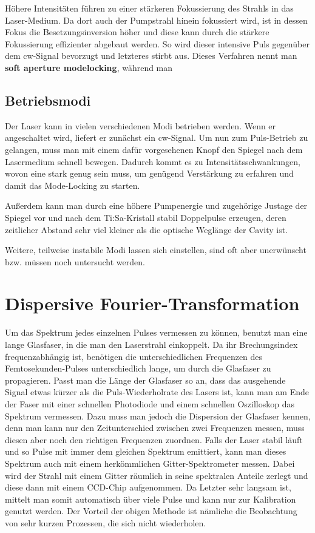 \documentclass[bachelor,       %
               twoside,        %
               BCOR10mm,       %
               english,ngerman, %
               ]{GAUBM}
\begin{document}
Höhere Intensitäten führen zu einer stärkeren Fokussierung des Strahls in das Laser-Medium.
Da dort auch der Pumpstrahl hinein fokussiert wird, ist in dessen Fokus die Besetzungsinversion höher und diese kann durch die stärkere Fokussierung effizienter abgebaut werden.
So wird dieser intensive Puls gegenüber dem cw-Signal bevorzugt und letzteres stirbt aus.
Dieses Verfahren nennt man \textbf{soft aperture modelocking}, während man 
\subsection{Betriebsmodi}
Der Laser kann in vielen verschiedenen Modi betrieben werden.
Wenn er angeschaltet wird, liefert er zunächst ein cw-Signal.
Um nun zum Puls-Betrieb zu gelangen, muss man mit einem dafür vorgesehenen Knopf den Spiegel nach dem Lasermedium schnell bewegen.
Dadurch kommt es zu Intensitätsschwankungen, wovon eine stark genug sein muss, um genügend Verstärkung zu erfahren und damit das Mode-Locking zu starten.

Außerdem kann man durch eine höhere Pumpenergie und zugehörige Justage der Spiegel vor und nach dem Ti:Sa-Kristall stabil Doppelpulse erzeugen, deren zeitlicher Abstand sehr viel kleiner als die optische Weglänge der Cavity ist.

Weitere, teilweise instabile Modi lassen sich einstellen, sind oft aber unerwünscht bzw. müssen noch untersucht werden.


\section{Dispersive Fourier-Transformation}
Um das Spektrum jedes einzelnen Pulses vermessen zu können, benutzt man eine lange Glasfaser, in die man den Laserstrahl einkoppelt.
Da ihr Brechungsindex frequenzabhängig ist, benötigen die unterschiedlichen Frequenzen des Femtosekunden-Pulses unterschiedlich lange, um durch die Glasfaser zu propagieren.
Passt man die Länge der Glasfaser so an, dass das ausgehende Signal etwas kürzer als die Puls-Wiederholrate des Lasers ist, kann man am Ende der Faser mit einer schnellen Photodiode und einem schnellen Oszilloskop das Spektrum vermessen.
Dazu muss man jedoch die Dispersion der Glasfaser kennen, denn man kann nur den Zeitunterschied zwischen zwei Frequenzen messen, muss diesen aber noch den richtigen Frequenzen zuordnen.
Falls der Laser stabil läuft und so Pulse mit immer dem gleichen Spektrum emittiert, kann man dieses Spektrum auch mit einem herkömmlichen Gitter-Spektrometer messen.
Dabei wird der Strahl mit einem Gitter räumlich in seine spektralen Anteile zerlegt und diese dann mit einem CCD-Chip aufgenommen.
Da Letzter sehr langsam ist, mittelt man somit automatisch über viele Pulse und kann nur zur Kalibration genutzt werden.
Der Vorteil der obigen Methode ist nämliche die Beobachtung von sehr kurzen Prozessen, die sich nicht wiederholen.
\end{document}
